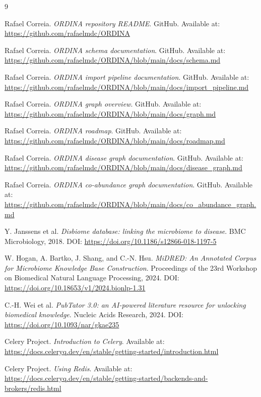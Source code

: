 \documentclass[11pt,a4paper]{article}
\begin{document}
\begin{thebibliography}{9}

Rafael Correia. \emph{ORDINA repository README}. GitHub. Available at: \url{https://github.com/rafaelmdc/ORDINA}

Rafael Correia. \emph{ORDINA schema documentation}. GitHub. Available at: \url{https://github.com/rafaelmdc/ORDINA/blob/main/docs/schema.md}

Rafael Correia. \emph{ORDINA import pipeline documentation}. GitHub. Available at: \url{https://github.com/rafaelmdc/ORDINA/blob/main/docs/import_pipeline.md}

Rafael Correia. \emph{ORDINA graph overview}. GitHub. Available at: \url{https://github.com/rafaelmdc/ORDINA/blob/main/docs/graph.md}

Rafael Correia. \emph{ORDINA roadmap}. GitHub. Available at: \url{https://github.com/rafaelmdc/ORDINA/blob/main/docs/roadmap.md}

Rafael Correia. \emph{ORDINA disease graph documentation}. GitHub. Available at: \url{https://github.com/rafaelmdc/ORDINA/blob/main/docs/disease_graph.md}

Rafael Correia. \emph{ORDINA co-abundance graph documentation}. GitHub. Available at: \url{https://github.com/rafaelmdc/ORDINA/blob/main/docs/co_abundance_graph.md}

Y. Janssens et al. \emph{Disbiome database: linking the microbiome to disease}. BMC Microbiology, 2018. DOI: \url{https://doi.org/10.1186/s12866-018-1197-5}

W. Hogan, A. Bartko, J. Shang, and C.-N. Hsu. \emph{MiDRED: An Annotated Corpus for Microbiome Knowledge Base Construction}. Proceedings of the 23rd Workshop on Biomedical Natural Language Processing, 2024. DOI: \url{https://doi.org/10.18653/v1/2024.bionlp-1.31}

C.-H. Wei et al. \emph{PubTator 3.0: an AI-powered literature resource for unlocking biomedical knowledge}. Nucleic Acids Research, 2024. DOI: \url{https://doi.org/10.1093/nar/gkae235}

Celery Project. \emph{Introduction to Celery}. Available at: \url{https://docs.celeryq.dev/en/stable/getting-started/introduction.html}

Celery Project. \emph{Using Redis}. Available at: \url{https://docs.celeryq.dev/en/stable/getting-started/backends-and-brokers/redis.html}

\end{thebibliography}
\end{document}
